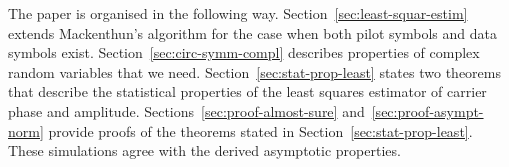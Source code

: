 \documentclass[journal]{IEEEtran}
\begin{document}
The paper is organised in the following way.  Section~\ref{sec:least-squar-estim} extends Mackenthun's algorithm for the case when both pilot symbols and data symbols exist.  Section~\ref{sec:circ-symm-compl} describes properties of complex random variables that we need.  Section~\ref{sec:stat-prop-least} states two theorems that describe the statistical properties of the least squares estimator of carrier phase and amplitude.  %
Sections~\ref{sec:proof-almost-sure} and~\ref{sec:proof-asympt-norm} provide proofs of the theorems stated in Section~\ref{sec:stat-prop-least}.  %
These simulations agree with the derived asymptotic properties. 

\end{document}
